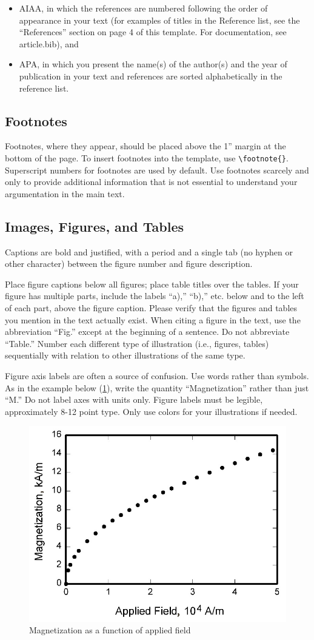 \begin{itemize}
    \item AIAA, in which the references are numbered following the order of appearance in your text (for examples of titles in the Reference list, see the “References” section on page 4 of this template. For documentation, see article.bib), and
    \item APA, in which you present the name(s) of the author(s) and the year of publication in your text and references are sorted alphabetically in the reference list.
\end{itemize}

\subsection{Footnotes}
Footnotes, where they appear, should be placed above the 1” margin at the bottom of the page. To insert footnotes into the template, use \verb+\footnote{}+. Superscript numbers for footnotes are used by default. Use footnotes scarcely and only to provide additional information that is not essential to understand your argumentation in the main text.

\subsection{Images, Figures, and Tables}
Captions are bold and justified, with a period and a single tab (no hyphen or other character) between the figure number and figure description.

Place figure captions below all figures; place table titles over the tables. If your figure has multiple parts, include the labels “a),” “b),” etc. below and to the left of each part, above the figure caption. Please verify that the figures and tables you mention in the text actually exist. When citing a figure in the text, use the abbreviation “Fig.” except at the beginning of a sentence. Do not abbreviate “Table.” Number each different type of illustration (i.e., figures, tables) sequentially with relation to other illustrations of the same type.

Figure axis labels are often a source of confusion. Use words rather than symbols. As in the example below (\cref{fig:sample}), write the quantity “Magnetization” rather than just “M.” Do not label axes with units only.
Figure labels must be legible, approximately 8-12 point type. Only use colors for your illustrations if needed.

\begin{figure}[htb]
    \centering
    \includegraphics[width=0.4\linewidth]{figures/graph.jpg}
    \caption{Magnetization as a function of applied field}
    \label{fig:sample}
\end{figure}

